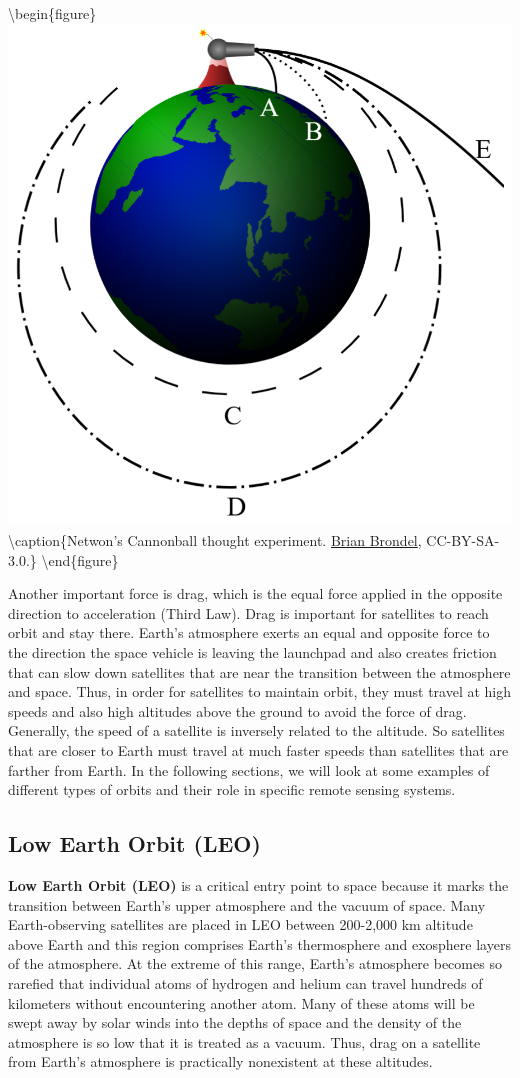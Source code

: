 \documentclass[
]{book}
\begin{document}
\textbackslash begin\{figure\}
\includegraphics[width=0.75\linewidth]{images/12-newtons-cannonball} \textbackslash caption\{Netwon's Cannonball thought experiment. \href{https://upload.wikimedia.org/wikipedia/commons/archive/7/73/20070210061321\%21Newton_Cannon.svg}{Brian Brondel}, CC-BY-SA-3.0.\}\label{fig:12-newtons-cannonball}
\textbackslash end\{figure\}

Another important force is drag, which is the equal force applied in the opposite direction to acceleration (Third Law). Drag is important for satellites to reach orbit and stay there. Earth's atmosphere exerts an equal and opposite force to the direction the space vehicle is leaving the launchpad and also creates friction that can slow down satellites that are near the transition between the atmosphere and space. Thus, in order for satellites to maintain orbit, they must travel at high speeds and also high altitudes above the ground to avoid the force of drag. Generally, the speed of a satellite is inversely related to the altitude. So satellites that are closer to Earth must travel at much faster speeds than satellites that are farther from Earth. In the following sections, we will look at some examples of different types of orbits and their role in specific remote sensing systems.

\hypertarget{low-earth-orbit-leo}{%
\subsection{Low Earth Orbit (LEO)}\label{low-earth-orbit-leo}}

\textbf{Low Earth Orbit (LEO)} is a critical entry point to space because it marks the transition between Earth's upper atmosphere and the vacuum of space. Many Earth-observing satellites are placed in LEO between 200-2,000 km altitude above Earth and this region comprises Earth's thermosphere and exosphere layers of the atmosphere. At the extreme of this range, Earth's atmosphere becomes so rarefied that individual atoms of hydrogen and helium can travel hundreds of kilometers without encountering another atom. Many of these atoms will be swept away by solar winds into the depths of space and the density of the atmosphere is so low that it is treated as a vacuum. Thus, drag on a satellite from Earth's atmosphere is practically nonexistent at these altitudes.
\end{document}
